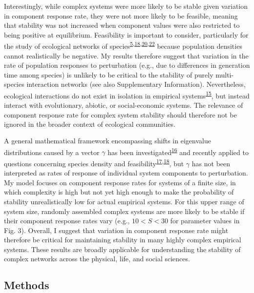 \documentclass[]{article}
\begin{document}
Interestingly, while complex systems were more likely to be stable given
variation in component response rate, they were not more likely to be
feasible, meaning that stability was not increased when component values
were also restricted to being positive at equilibrium. Feasibility is
important to consider, particularly for the study of ecological networks
of
species\textsuperscript{\protect\hyperlink{ref-Grilli2017}{5},\protect\hyperlink{ref-Stone2017}{18},\protect\hyperlink{ref-Dougoud2018}{20},\protect\hyperlink{ref-Servan2018}{22}}
because population densities cannot realistically be negative. My
results therefore suggest that variation in the rate of population
responses to perturbation (e.g., due to differences in generation time
among species) is unlikely to be critical to the stability of purely
multi-species interaction networks (see also Supplementary Information).
Nevertheless, ecological interactions do not exist in isolation in
empirical
systems\textsuperscript{\protect\hyperlink{ref-Patel2018}{15}}, but
instead interact with evolutionary, abiotic, or social-economic systems.
The relevance of component response rate for complex system stability
should therefore not be ignored in the broader context of ecological
communities.

A general mathematical framework encompassing shifts in eigenvalue
distributions caused by a vector \(\gamma\) has been
investigated\textsuperscript{\protect\hyperlink{ref-Ahmadian2015}{16}}
and recently applied to questions concerning species density and
feasibility\textsuperscript{\protect\hyperlink{ref-Gibbs2017}{17},\protect\hyperlink{ref-Stone2017}{18}},
but \(\gamma\) has not been interpreted as rates of response of
individual system components to perturbation. My model focuses on
component response rates for systems of a finite size, in which
complexity is high but not yet high enough to make the probability of
stability unrealistically low for actual empirical systems. For this
upper range of system size, randomly assembled complex systems are more
likely to be stable if their component response rates vary (e.g.,
\(10 < S < 30\) for parameter values in Fig. 3). Overall, I suggest that
variation in component response rate might therefore be critical for
maintaining stability in many highly complex empirical systems. These
results are broadly applicable for understanding the stability of
complex networks across the physical, life, and social sciences.

\subsection{Methods}\label{methods}
\end{document}
